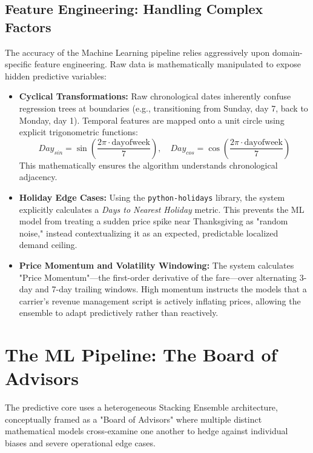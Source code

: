 \documentclass[12pt, a4paper]{article}
\begin{document}
\subsection{Feature Engineering: Handling Complex Factors}
The accuracy of the Machine Learning pipeline relies aggressively upon domain-specific feature engineering. Raw data is mathematically manipulated to expose hidden predictive variables:

\begin{itemize}
    \item \textbf{Cyclical Transformations:} Raw chronological dates inherently confuse regression trees at boundaries (e.g., transitioning from Sunday, day 7, back to Monday, day 1). Temporal features are mapped onto a unit circle using explicit trigonometric functions:
    \begin{equation}
        Day_{sin} = \sin\left(\frac{2\pi \cdot \text{dayofweek}}{7}\right), \quad Day_{cos} = \cos\left(\frac{2\pi \cdot \text{dayofweek}}{7}\right)
    \end{equation}
    This mathematically ensures the algorithm understands chronological adjacency.
    
    \item \textbf{Holiday Edge Cases:} Using the \texttt{python-holidays} library, the system explicitly calculates a \textit{Days to Nearest Holiday} metric. This prevents the ML model from treating a sudden price spike near Thanksgiving as "random noise," instead contextualizing it as an expected, predictable localized demand ceiling.
    
    \item \textbf{Price Momentum and Volatility Windowing:} The system calculates "Price Momentum"—the first-order derivative of the fare—over alternating 3-day and 7-day trailing windows. High momentum instructs the models that a carrier's revenue management script is actively inflating prices, allowing the ensemble to adapt predictively rather than reactively.
\end{itemize}

\newpage

\section{The ML Pipeline: The Board of Advisors}

The predictive core uses a heterogeneous Stacking Ensemble architecture, conceptually framed as a "Board of Advisors" where multiple distinct mathematical models cross-examine one another to hedge against individual biases and severe operational edge cases.
\end{document}
